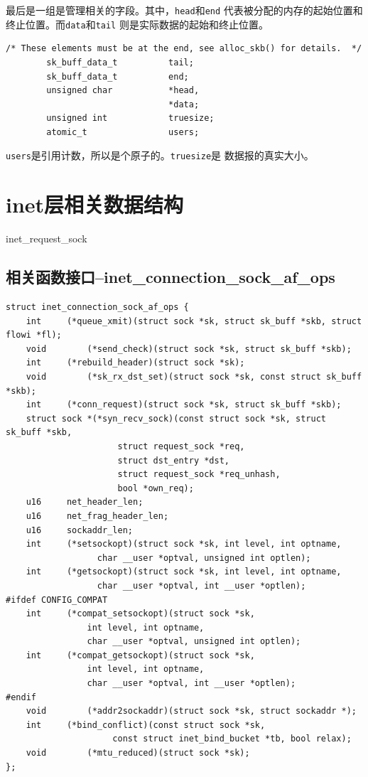 \documentclass[11pt, a4paper,oneside]{book}
\theoremstyle{ocrenumbox}
\theoremstyle{purplenumbox}
\theoremstyle{blackbox}
\begin{document}
最后是一组是管理相关的字段。其中，\texttt{head}和\texttt{end}
代表被分配的内存的起始位置和终止位置。而\texttt{data}和\texttt{tail}
则是实际数据的起始和终止位置。
\begin{verbatim}
/* These elements must be at the end, see alloc_skb() for details.  */
        sk_buff_data_t          tail;
        sk_buff_data_t          end;
        unsigned char           *head,
                                *data;
        unsigned int            truesize;
        atomic_t                users;
\end{verbatim}
\texttt{users}是引用计数，所以是个原子的。\texttt{truesize}是
数据报的真实大小。
	\section{inet层相关数据结构}	
		inet\_request\_sock		
		\subsection{相关函数接口--inet\_connection\_sock\_af\_ops}
\begin{verbatim}
struct inet_connection_sock_af_ops {
	int	    (*queue_xmit)(struct sock *sk, struct sk_buff *skb, struct flowi *fl);
	void	    (*send_check)(struct sock *sk, struct sk_buff *skb);
	int	    (*rebuild_header)(struct sock *sk);
	void	    (*sk_rx_dst_set)(struct sock *sk, const struct sk_buff *skb);
	int	    (*conn_request)(struct sock *sk, struct sk_buff *skb);
	struct sock *(*syn_recv_sock)(const struct sock *sk, struct sk_buff *skb,
				      struct request_sock *req,
				      struct dst_entry *dst,
				      struct request_sock *req_unhash,
				      bool *own_req);
	u16	    net_header_len;
	u16	    net_frag_header_len;
	u16	    sockaddr_len;
	int	    (*setsockopt)(struct sock *sk, int level, int optname, 
				  char __user *optval, unsigned int optlen);
	int	    (*getsockopt)(struct sock *sk, int level, int optname, 
				  char __user *optval, int __user *optlen);
#ifdef CONFIG_COMPAT
	int	    (*compat_setsockopt)(struct sock *sk,
				int level, int optname,
				char __user *optval, unsigned int optlen);
	int	    (*compat_getsockopt)(struct sock *sk,
				int level, int optname,
				char __user *optval, int __user *optlen);
#endif
	void	    (*addr2sockaddr)(struct sock *sk, struct sockaddr *);
	int	    (*bind_conflict)(const struct sock *sk,
				     const struct inet_bind_bucket *tb, bool relax);
	void	    (*mtu_reduced)(struct sock *sk);
};
\end{verbatim}
\end{document}
